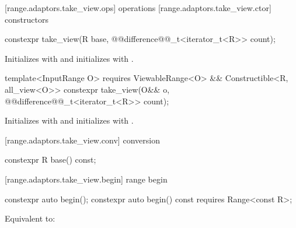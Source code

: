 [range.adaptors.take_view.ops]{ operations}
[range.adaptors.take_view.ctor]{ constructors}

%
\begin{itemdecl}
constexpr take_view(R base, @@difference@@_t<iterator_t<R>> count);
\end{itemdecl}

\begin{itemdescr}
\pnum
\effects Initializes  with  and initializes
 with .
\end{itemdescr}

%
\begin{itemdecl}
template<InputRange O>
  requires ViewableRange<O> && Constructible<R, all_view<O>>
constexpr take_view(O&& o, @@difference@@_t<iterator_t<R>> count);
\end{itemdecl}

\begin{itemdescr}
\pnum
\effects Initializes  with 
and initializes  with .
\end{itemdescr}

[range.adaptors.take_view.conv]{ conversion}

%
\begin{itemdecl}
constexpr R base() const;
\end{itemdecl}

\begin{itemdescr}
\pnum
\oldtxt{\returns}  
\end{itemdescr}

[range.adaptors.take_view.begin]{ range begin}

%
\begin{itemdecl}
constexpr auto begin();
constexpr auto begin() const requires Range<const R>;
\end{itemdecl}

\begin{itemdescr}
\pnum
\effects Equivalent to: 
\end{itemdescr}

